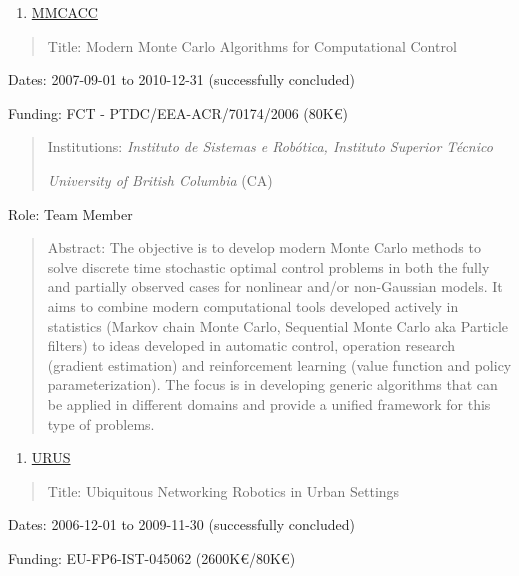 \documentclass[
]{article}
\begin{document}
\begin{enumerate}
\def\labelenumi{\arabic{enumi}.}
\setcounter{enumi}{11}
\item
  \ul{MMCACC}
\end{enumerate}

\begin{quote}
Title: Modern Monte Carlo Algorithms for Computational Control
\end{quote}

Dates: 2007-09-01 to 2010-12-31 (successfully concluded)

Funding: FCT - PTDC/EEA-ACR/70174/2006 (80K€)

\begin{quote}
Institutions: \emph{Instituto de Sistemas e Robótica, Instituto Superior
Técnico}

\emph{University of British Columbia} (CA)
\end{quote}

Role: Team Member

\begin{quote}
Abstract: The objective is to develop modern Monte Carlo methods to
solve discrete time stochastic optimal control problems in both the
fully and partially observed cases for nonlinear and/or non-Gaussian
models. It aims to combine modern computational tools developed actively
in statistics (Markov chain Monte Carlo, Sequential Monte Carlo aka
Particle filters) to ideas developed in automatic control, operation
research (gradient estimation) and reinforcement learning (value
function and policy parameterization). The focus is in developing
generic algorithms that can be applied in different domains and provide
a unified framework for this type of problems.
\end{quote}

\begin{enumerate}
\def\labelenumi{\arabic{enumi}.}
\setcounter{enumi}{12}
\item
  \ul{URUS}
\end{enumerate}

\begin{quote}
Title: Ubiquitous Networking Robotics in Urban Settings
\end{quote}

Dates: 2006-12-01 to 2009-11-30 (successfully concluded)

Funding: EU-FP6-IST-045062 (2600K€/80K€)
\end{document}
